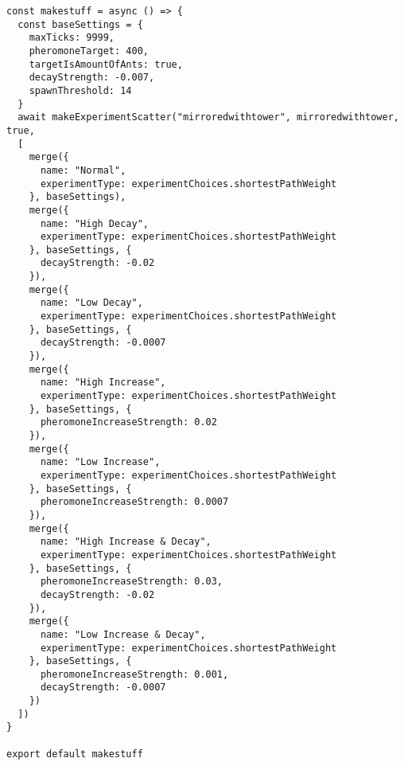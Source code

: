 \begin{lstlisting}
const makestuff = async () => {
  const baseSettings = {
    maxTicks: 9999,
    pheromoneTarget: 400,
    targetIsAmountOfAnts: true,
    decayStrength: -0.007,
    spawnThreshold: 14
  }
  await makeExperimentScatter("mirroredwithtower", mirroredwithtower, true,
  [
    merge({
      name: "Normal",
      experimentType: experimentChoices.shortestPathWeight
    }, baseSettings),
    merge({
      name: "High Decay",
      experimentType: experimentChoices.shortestPathWeight
    }, baseSettings, {
      decayStrength: -0.02
    }),
    merge({
      name: "Low Decay",
      experimentType: experimentChoices.shortestPathWeight
    }, baseSettings, {
      decayStrength: -0.0007
    }),
    merge({
      name: "High Increase",
      experimentType: experimentChoices.shortestPathWeight
    }, baseSettings, {
      pheromoneIncreaseStrength: 0.02
    }),
    merge({
      name: "Low Increase",
      experimentType: experimentChoices.shortestPathWeight
    }, baseSettings, {
      pheromoneIncreaseStrength: 0.0007
    }),
    merge({
      name: "High Increase & Decay",
      experimentType: experimentChoices.shortestPathWeight
    }, baseSettings, {
      pheromoneIncreaseStrength: 0.03,
      decayStrength: -0.02
    }),
    merge({
      name: "Low Increase & Decay",
      experimentType: experimentChoices.shortestPathWeight
    }, baseSettings, {
      pheromoneIncreaseStrength: 0.001,
      decayStrength: -0.0007
    })
  ])
}

export default makestuff

\end{lstlisting}
